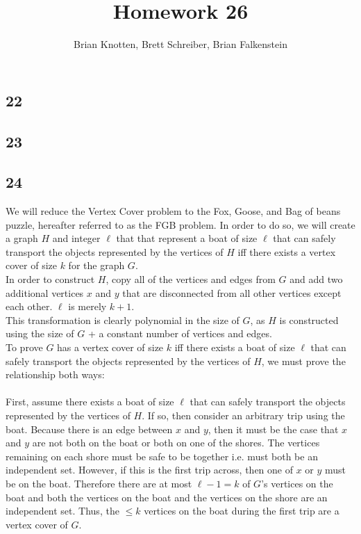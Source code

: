 \documentclass[letterpaper,notitlepage,twoside]{article}
\begin{document}
\title{Homework 26}
\author{Brian Knotten, Brett Schreiber, Brian Falkenstein}
\maketitle
\subsection*{22}


\subsection*{23}


\subsection*{24}
We will reduce the Vertex Cover problem to the Fox, Goose, and Bag of beans puzzle, hereafter referred to as the FGB problem. In order to do so, we will create a graph $H$ and integer $\ell$ that that represent a boat of size $\ell$ that can safely transport the objects represented by the vertices of $H$ iff there exists a vertex cover of size $k$ for the graph $G$. \\
In order to construct $H$, copy all of the vertices and edges from $G$ and add two additional vertices $x$ and $y$ that are disconnected from all other vertices except each other. $\ell$ is merely $k+1$. \\
This transformation is clearly polynomial in the size of $G$, as $H$ is constructed using the size of $G$ + a constant number of vertices and edges. \\
To prove $G$ has a vertex cover of size $k$ iff there exists a boat of size $\ell$ that can safely transport the objects represented by the vertices of $H$, we must prove the relationship both ways: \\\\
First, assume there exists a boat of size $\ell$ that can safely transport the objects represented by the vertices of $H$. If so, then consider an arbitrary trip using the boat. Because there is an edge between $x$ and $y$, then it must be the case that $x$ and $y$ are not both on the boat or both on one of the shores. The vertices remaining on each shore must be safe to be together i.e. must both be an independent set. However, if this is the first trip across, then one of $x$ or $y$ must be on the boat. Therefore there are at most $\ell - 1 = k$ of $G$'s vertices on the boat and both the vertices on the boat and the vertices on the shore are an independent set. Thus, the $\leq k$ vertices on the boat during the first trip are a vertex cover of $G$. \\\\ 
\end{document}
